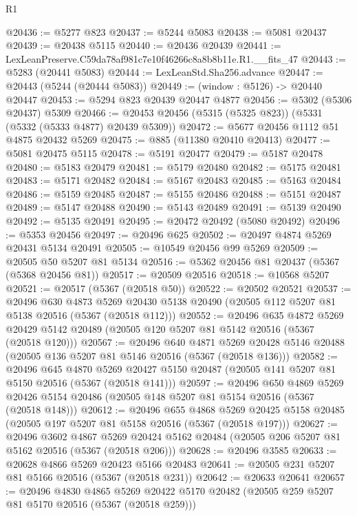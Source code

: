 \begin{lexlean}{R1}
\begin{coremodule}
@20436 := @5277 @823
@20437 := @5244 @5083
@20438 := @5081 @20437
@20439 := @20438 @5115
@20440 := @20436 @20439
@20441 := LexLeanPreserve.C59da78af981c7e10f46266c8a8b8b11e.R1.__fits_47
@20443 := @5283 (@20441 @5083)
@20444 := LexLeanStd.Sha256.advance
@20447 := @20443 (@5244 (@20444 @5083))
@20449 := (window : @5126) -> @20440 @20447
@20453 := @5294 @823 @20439 @20447 @4877
@20456 := @5302 (@5306 @20437) @5309
@20466 := @20453 @20456 (@5315 (@5325 @823)) (@5331 (@5332 (@5333 @4877) @20439 @5309))
@20472 := @5677 @20456 @1112 @51 @4875 @20432 @5269
@20475 := @885 (@11380 @20410 @20413)
@20477 := @5081 @20475 @5115
@20478 := @5191 @20477
@20479 := @5187 @20478
@20480 := @5183 @20479
@20481 := @5179 @20480
@20482 := @5175 @20481
@20483 := @5171 @20482
@20484 := @5167 @20483
@20485 := @5163 @20484
@20486 := @5159 @20485
@20487 := @5155 @20486
@20488 := @5151 @20487
@20489 := @5147 @20488
@20490 := @5143 @20489
@20491 := @5139 @20490
@20492 := @5135 @20491
@20495 := @20472 @20492 (@5080 @20492)
@20496 := @5353 @20456
@20497 := @20496 @625
@20502 := @20497 @4874 @5269 @20431 @5134 @20491
@20505 := @10549 @20456 @99 @5269
@20509 := @20505 @50 @5207 @81 @5134
@20516 := @5362 @20456 @81 @20437 (@5367 (@5368 @20456 @81))
@20517 := @20509 @20516
@20518 := @10568 @5207
@20521 := @20517 (@5367 (@20518 @50))
@20522 := @20502 @20521
@20537 := @20496
    @630
    @4873
    @5269
    @20430
    @5138
    @20490
    (@20505 @112 @5207 @81 @5138 @20516 (@5367 (@20518 @112)))
@20552 := @20496
    @635
    @4872
    @5269
    @20429
    @5142
    @20489
    (@20505 @120 @5207 @81 @5142 @20516 (@5367 (@20518 @120)))
@20567 := @20496
    @640
    @4871
    @5269
    @20428
    @5146
    @20488
    (@20505 @136 @5207 @81 @5146 @20516 (@5367 (@20518 @136)))
@20582 := @20496
    @645
    @4870
    @5269
    @20427
    @5150
    @20487
    (@20505 @141 @5207 @81 @5150 @20516 (@5367 (@20518 @141)))
@20597 := @20496
    @650
    @4869
    @5269
    @20426
    @5154
    @20486
    (@20505 @148 @5207 @81 @5154 @20516 (@5367 (@20518 @148)))
@20612 := @20496
    @655
    @4868
    @5269
    @20425
    @5158
    @20485
    (@20505 @197 @5207 @81 @5158 @20516 (@5367 (@20518 @197)))
@20627 := @20496
    @3602
    @4867
    @5269
    @20424
    @5162
    @20484
    (@20505 @206 @5207 @81 @5162 @20516 (@5367 (@20518 @206)))
@20628 := @20496 @3585
@20633 := @20628 @4866 @5269 @20423 @5166 @20483
@20641 := @20505 @231 @5207 @81 @5166 @20516 (@5367 (@20518 @231))
@20642 := @20633 @20641
@20657 := @20496
    @4830
    @4865
    @5269
    @20422
    @5170
    @20482
    (@20505 @259 @5207 @81 @5170 @20516 (@5367 (@20518 @259)))

\end{coremodule}
\end{lexlean}
